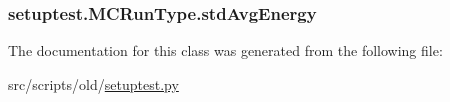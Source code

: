 \hypertarget{classsetuptest_1_1_m_c_run_type_abf6e141931490ebd048577558ca0eb87}{
\subsubsection[{std\-Avg\-Energy}]{\setlength{\rightskip}{0pt plus 5cm}setuptest.\-M\-C\-Run\-Type.\-std\-Avg\-Energy}}\label{classsetuptest_1_1_m_c_run_type_abf6e141931490ebd048577558ca0eb87}


The documentation for this class was generated from the following file\-:\begin{DoxyCompactItemize}
\item 
src/scripts/old/\hyperlink{setuptest_8py}{setuptest.\-py}\end{DoxyCompactItemize}
